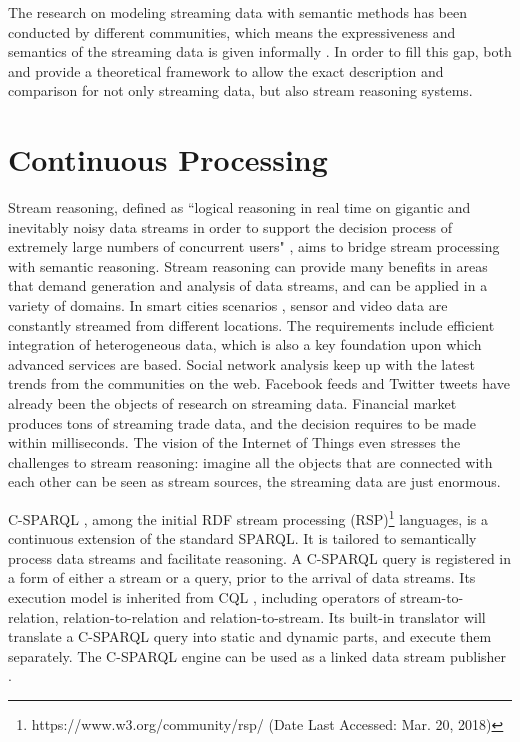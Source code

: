 The research on modeling streaming data with semantic methods has been conducted by different communities, which means the expressiveness and semantics of the streaming data is given informally \cite{della2009s}.
In order to fill this gap, both \cite{beck2015towards} and \cite{beck2015lars} provide a theoretical framework to allow the exact description and comparison for not only streaming data, but also stream reasoning systems.
%
\section{Continuous Processing}
Stream reasoning, defined as ``logical reasoning in real time on gigantic and inevitably noisy data streams in order to support the decision process of extremely large numbers of concurrent users" \cite{stuckenschmidt2010towards}, aims to bridge stream processing with semantic reasoning. 
Stream reasoning can provide many benefits in areas that demand generation and analysis of data streams, and can be applied in a variety of domains.
In smart cities scenarios \cite{tallevi2013real} \cite{lecue2012capturing}, sensor and video data are constantly streamed from different locations.
The requirements include efficient integration of heterogeneous data, which is also a key foundation upon which advanced services are based. 
Social network analysis \cite{barbieri2009continuous} keep up with the latest trends from the communities on the web.
Facebook feeds and Twitter tweets have already been the objects of research on streaming data.
Financial market \cite{stonebraker20058} produces tons of streaming trade data, and the decision requires to be made within milliseconds.
The vision of the Internet of Things \cite{atzori2010internet} even stresses the challenges to stream reasoning: imagine all the objects that are connected with each other can be seen as stream sources, the streaming data are just enormous. 

C-SPARQL \cite{barbieri2009c}, among the initial RDF stream processing (RSP)\footnote{https://www.w3.org/community/rsp/ (Date Last Accessed: Mar. 20, 2018)} languages, is a continuous extension of the standard SPARQL. 
It is tailored to semantically process data streams and facilitate reasoning. 
A C-SPARQL query is registered in a form of either a stream or a query, prior to the arrival of data streams.
Its execution model is inherited from CQL \cite{arasu2006cql}, including operators of stream-to-relation, relation-to-relation and relation-to-stream. 
Its built-in translator will translate a C-SPARQL query into static and dynamic parts, and execute them separately. 
The C-SPARQL engine can be used as a linked data stream publisher \cite{barbieri2010proposal}. 

